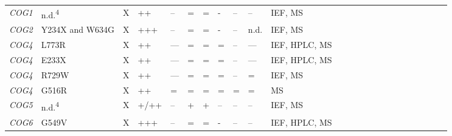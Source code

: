 \begin{landscape}
\begin{longtable}[c]{C{1.2cm}C{2cm}C{0.5cm}C{1.5cm}C{1.5cm}C{0.5cm}C{0.5cm}C{0.5cm}C{0.5cm}C{1.5cm}C{1.5cm}C{1.5cm}c c c c c c c c c c c c}
        \emph{COG1} & n.d.\textsuperscript{4} & X                       & ++                                      & --                                 & =   & = & -   & --  & --                                  & IEF, MS                       & \cite{zeevaert_cerebrocostomandibular-like_2009} \\
        \emph{COG2} & Y234X and W634G & X                       & +++                                      & --                                 & =   & = & -   & --  & n.d.                                  & IEF, MS                       & \cite{kodera_mutations_2015} \\
        \emph{COG4} & L773R & X                       & ++                                      & ---                                 & =   & = & =   & --  & ---                                  & IEF, HPLC, MS                       & \cite{ng_identification_2011,miura_clinical_2005} \\
        \emph{COG4} & E233X & X                       & ++                                      & ---                                 & =   & = & =   & --  & ---                                  & IEF, HPLC, MS                       & \cite{ng_identification_2011,miura_clinical_2005} \\
        \emph{COG4} & R729W & X                       & ++                                      & ---                                 & =   & = & =   & --  & =                                  & IEF, MS                       & \cite{reynders_golgi_2009} \\
        \emph{COG4} & G516R & X                       & ++                                      & =                                 & =   & = & =   & =  & =                                  & MS                       & \cite{ferreira_recurrent_2018} \\
        \emph{COG5} & n.d.\textsuperscript{4} & X                       & +/++                                      & --                                 & +   & + & --   & --  & --                                  & IEF, MS                       & \cite{palmigiano_maldi-ms_2017,fung_cog5-cdg_2012,paesold-burda_deficiency_2009,rymen_cog5-cdg_2012} \\
        \emph{COG6} & G549V & X                       & +++                                      & --                                 & =   & = & -   & --  & --                                  & IEF, HPLC, MS                       & \cite{lubbehusen_fatal_2010,huybrechts_deficiency_2012,shaheen_novel_2013,rymen_key_2015} \\

\end{longtable}
\end{landscape}
